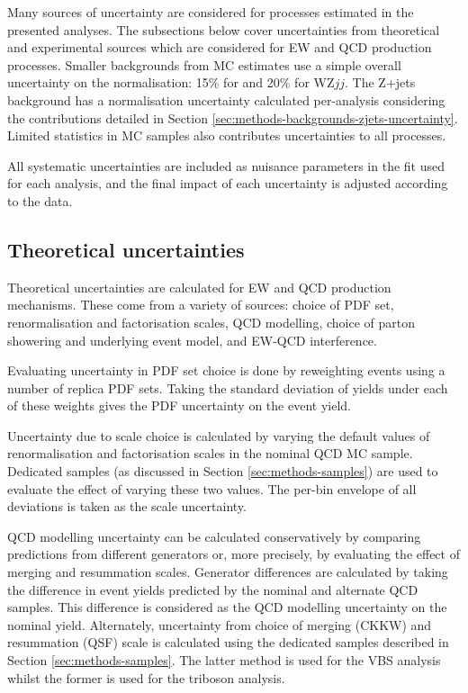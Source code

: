 
Many sources of uncertainty are considered for processes estimated in the
presented analyses. The subsections below cover uncertainties from theoretical
and experimental sources which are considered for \ac{EW} and \ac{QCD} \Zyjj
production processes.
Smaller backgrounds from \ac{MC} estimates use a simple overall uncertainty on
the normalisation: 15\% for \tty and 20\% for WZ$jj$. The Z+jets background has
a normalisation uncertainty calculated per-analysis considering the
contributions detailed in Section
\ref{sec:methods-backgrounds-zjets-uncertainty}. Limited statistics in \ac{MC}
samples also contributes uncertainties to all processes.

All systematic uncertainties are included as nuisance parameters in the fit used
for each analysis, and the final impact of each uncertainty is adjusted
according to the data.

\subsection{Theoretical uncertainties}

Theoretical uncertainties are calculated for \ac{EW} and \ac{QCD} \Zy production
mechanisms. These come from a variety of sources: choice of \ac{PDF} set,
renormalisation and factorisation scales, \ac{QCD} modelling, choice of parton
showering and underlying event model, and \ac{EW}-\ac{QCD} interference.

Evaluating uncertainty in \ac{PDF} set choice is done by reweighting events
using a number of replica \ac{PDF} sets. Taking the standard deviation of yields
under each of these weights gives the \ac{PDF} uncertainty on the event yield. 

Uncertainty due to scale choice is calculated by varying the default values of
renormalisation and factorisation scales in the nominal QCD \Zy \ac{MC} sample.
Dedicated samples (as discussed in Section \ref{sec:methods-samples}) are used
to evaluate the effect of varying these two values. The per-bin envelope of all
deviations is taken as the scale uncertainty.

\ac{QCD} modelling uncertainty can be calculated conservatively by comparing
predictions from different generators or, more precisely, by evaluating the
effect of merging and resummation scales. Generator differences are calculated
by taking the difference in event yields predicted by the nominal and alternate
\ac{QCD} \Zy samples. This difference is considered as the \ac{QCD} modelling
uncertainty on the nominal yield.
Alternately, uncertainty from choice of merging (CKKW) and
resummation (QSF) scale is calculated using the dedicated samples described in
Section \ref{sec:methods-samples}. The latter method is used for the \ac{VBS}
analysis whilst the former is used for the triboson analysis.

